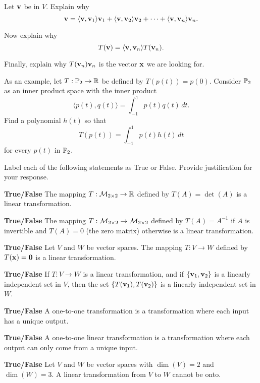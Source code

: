  \item Let $\mathbf{v}$ be in $V$. Explain why 
 \[\mathbf{v} = \langle \mathbf{v}, \mathbf{v}_1 \rangle \mathbf{v}_1 + \langle \mathbf{v}, \mathbf{v}_2 \rangle \mathbf{v}_2 + \cdots + \langle \mathbf{v}, \mathbf{v}_n \rangle \mathbf{v}_n.\]
 
\item Now explain why 
\[T(\mathbf{v}) = \langle \mathbf{v}, \mathbf{v}_n \rangle T(\mathbf{v}_n).\]
 
 \item Finally, explain why $T(\mathbf{v}_n)\mathbf{v}_n$ is the vector $\mathbf{x}$ we are looking for.
 
 \item As an example, let $T: \mathbb{P}_2 \to \mathbb{R}$ be defined by $T(p(t)) = p(0)$. Consider $\mathbb{P}_2$ as an inner product space with the inner product
 \[\langle p(t), q(t) \rangle = \int_{-1}^1 p(t)q(t) \, dt.\]
 Find a polynomial $h(t)$ so that 
 \[T(p(t)) = \int_{-1}^1 p(t)h(t) \, dt \]
 for every $p(t)$ in $\mathbb{P}_2$. 

 \ea
	
 \item Label each of the following statements as True or False. Provide justification for your response.
	\ba
\item \textbf{True/False} The mapping $T: \mathcal{M}_{2 \times 2} \to \mathbb{R}$ defined by $T(A) = \det(A)$ is a linear transformation. 
	
\item \textbf{True/False} The mapping $T: \mathcal{M}_{2 \times 2} \to \mathcal{M}_{2 \times 2}$ defined by $T(A) = A^{-1}$ if $A$ is invertible and $T(A) = 0$ (the zero matrix) otherwise is a linear transformation. 
	
\item \textbf{True/False}  Let $V$ and $W$ be vector spaces. The mapping $T: V \to W$ defined by $T(\mathbf{x}) = \mathbf{0}$ is a linear transformation. 

\item \textbf{True/False} If $T: V \to W$ is a linear transformation, and if $\{\mathbf{v}_1, \mathbf{v}_2\}$ is a linearly independent set in $V$, then the set $\{T(\mathbf{v}_1), T(\mathbf{v}_2)\}$ is a linearly independent set in $W$.

\item \textbf{True/False} A one-to-one transformation is a transformation where each input has a unique output.

\item \textbf{True/False} A one-to-one linear transformation is a transformation where each output can only come from a unique input.

\item \textbf{True/False} Let $V$ and $W$ be vector spaces with $\dim(V) = 2$ and $\dim(W) = 3$. A linear transformation from $V$ to $W$ cannot be onto.

